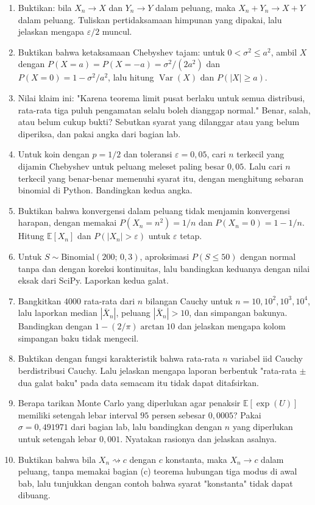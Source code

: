 \begin{latihan}
\begin{enumerate}
  \item Buktikan: bila $X_n\to X$ dan $Y_n\to Y$ dalam peluang, maka
        $X_n+Y_n\to X+Y$ dalam peluang. Tuliskan pertidaksamaan himpunan yang
        dipakai, lalu jelaskan mengapa $\varepsilon/2$ muncul.
  \item Buktikan bahwa ketaksamaan Chebyshev tajam: untuk $0<\sigma^2\le a^2$,
        ambil $X$ dengan $P(X=a)=P(X=-a)=\sigma^2/(2a^2)$ dan
        $P(X=0)=1-\sigma^2/a^2$, lalu hitung $\operatorname{Var}(X)$ dan
        $P(|X|\ge a)$.
  \item Nilai klaim ini: "Karena teorema limit pusat berlaku untuk semua
        distribusi, rata-rata tiga puluh pengamatan selalu boleh dianggap
        normal." Benar, salah, atau belum cukup bukti? Sebutkan syarat yang
        dilanggar atau yang belum diperiksa, dan pakai angka dari bagian lab.
  \item Untuk koin dengan $p=1/2$ dan toleransi $\varepsilon=0{,}05$, cari $n$
        terkecil yang dijamin Chebyshev untuk peluang meleset paling besar
        $0{,}05$. Lalu cari $n$ terkecil yang benar-benar memenuhi syarat itu,
        dengan menghitung sebaran binomial di Python. Bandingkan kedua angka.
  \item Buktikan bahwa konvergensi dalam peluang tidak menjamin konvergensi
        harapan, dengan memakai $P(X_n=n^2)=1/n$ dan $P(X_n=0)=1-1/n$. Hitung
        $\mathbb{E}[X_n]$ dan $P(|X_n|>\varepsilon)$ untuk $\varepsilon$ tetap.
  \item Untuk $S\sim\text{Binomial}(200;\,0{,}3)$, aproksimasi $P(S\le50)$ dengan
        normal tanpa dan dengan koreksi kontinuitas, lalu bandingkan keduanya
        dengan nilai eksak dari SciPy. Laporkan kedua galat.
  \item Bangkitkan $4000$ rata-rata dari $n$ bilangan Cauchy untuk
        $n=10,10^2,10^3,10^4$, lalu laporkan median $|\bar X_n|$, peluang
        $|\bar X_n|>10$, dan simpangan bakunya. Bandingkan dengan
        $1-(2/\pi)\arctan10$ dan jelaskan mengapa kolom simpangan baku tidak
        mengecil.
  \item Buktikan dengan fungsi karakteristik bahwa rata-rata $n$ variabel iid
        Cauchy berdistribusi Cauchy. Lalu jelaskan mengapa laporan berbentuk
        "rata-rata $\pm$ dua galat baku" pada data semacam itu tidak dapat
        ditafsirkan.
  \item Berapa tarikan Monte Carlo yang diperlukan agar penaksir
        $\mathbb{E}[\exp(U)]$ memiliki setengah lebar interval $95$ persen
        sebesar $0{,}0005$? Pakai $\sigma=0{,}491971$ dari bagian lab, lalu
        bandingkan dengan $n$ yang diperlukan untuk setengah lebar $0{,}001$.
        Nyatakan rasionya dan jelaskan asalnya.
  \item Buktikan bahwa bila $X_n\rightsquigarrow c$ dengan $c$ konstanta, maka
        $X_n\to c$ dalam peluang, tanpa memakai bagian (c) teorema hubungan tiga
        modus di awal bab, lalu tunjukkan dengan contoh bahwa syarat "konstanta"
        tidak dapat dibuang.
\end{enumerate}


\end{latihan}

